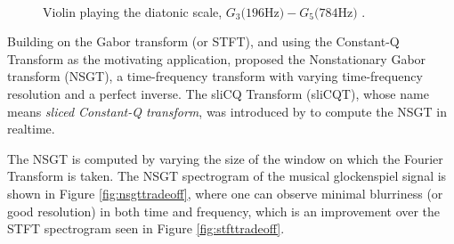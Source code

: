 \documentclass[report.tex]{subfiles}
\begin{document}
\begin{figure}[ht]
	\centering
	\\
	\caption{Violin playing the diatonic scale, $G_{3} \text{(196Hz)} - G_{5} \text{(784Hz)}$ \parencite[430]{jbrown}.}
	\label{fig:violin}
\end{figure}

Building on the Gabor transform (or STFT), and using the Constant-Q Transform as the motivating application, \textcite{balazs} proposed the Nonstationary Gabor transform (NSGT), a time-frequency transform with varying time-frequency resolution and a perfect inverse. The sliCQ Transform (sliCQT), whose name means \textit{sliced Constant-Q transform}, was introduced by \textcite{slicq} to compute the NSGT in realtime.

The NSGT is computed by varying the size of the window on which the Fourier Transform is taken. The NSGT spectrogram of the musical glockenspiel signal is shown in Figure \ref{fig:nsgttradeoff}, where one can observe minimal blurriness (or good resolution) in both time and frequency, which is an improvement over the STFT spectrogram seen in Figure \ref{fig:stfttradeoff}.
\end{document}
